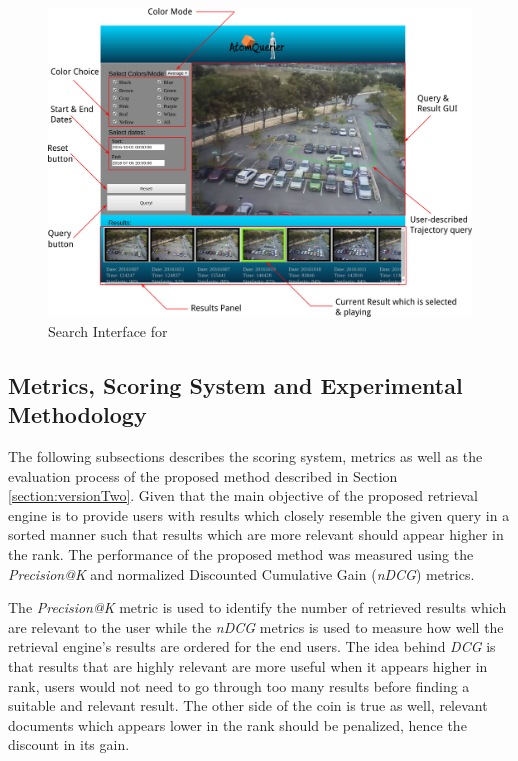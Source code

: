 \begin{figure}[hbt!]\centering
\includegraphics[width=.9\textwidth]{image/retrievalTwo/VISERinterface2.png}
\caption{Search Interface for \versionTwoRet}
\label{fig:versionTwoInterface}
\end{figure}

\subsection{Metrics, Scoring System and Experimental Methodology}

The following subsections describes the scoring system, metrics as well as the evaluation process of the proposed method described in Section \ref{section:versionTwo}. Given that the main objective of the proposed retrieval engine is to provide users with results which closely resemble the given query in a sorted manner such that results which are more relevant should appear higher in the rank. The performance of the proposed method was measured using the \textit{Precision@K} and normalized Discounted Cumulative Gain (\textit{nDCG}) metrics.  

The \textit{Precision@K} metric is used to identify the number of retrieved results which are relevant to the user while the \textit{nDCG} metrics is used to measure how well the retrieval engine's results are ordered for the end users. The idea behind \textit{DCG} is that results that are highly relevant are more useful when it appears higher in rank, users would not need to go through too many results before finding a suitable and relevant result. The other side of the coin is true as well, relevant documents which appears lower in the rank should be penalized, hence the discount in its gain.

